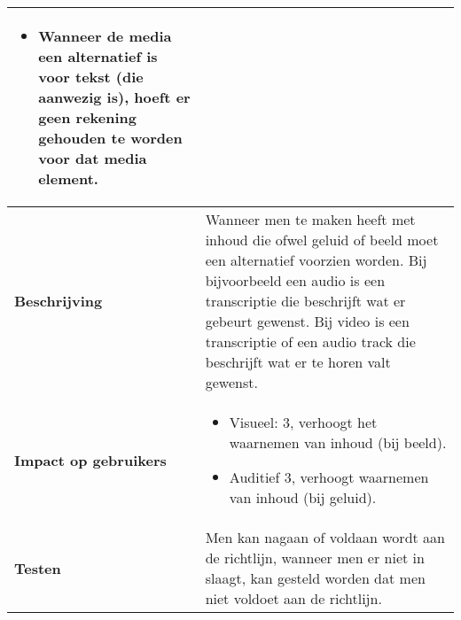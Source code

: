\begin{table}[H]
\begin{tabular}{|l|p{12cm}|}
\begin{itemize}
        \item Wanneer de media een alternatief is voor tekst (die aanwezig is), hoeft er geen rekening gehouden te worden voor dat media element.
    \end{itemize}                                                                                                                                                                                                      \\ 
        \hline
        \textbf{Beschrijving}                & Wanneer men te maken heeft met inhoud die ofwel geluid of beeld moet een alternatief voorzien worden. Bij bijvoorbeeld een audio is een transcriptie die beschrijft wat er gebeurt gewenst. Bij video is een transcriptie of een audio track die beschrijft wat er te horen valt gewenst. \\ 
        \hline
        \textbf{Impact op gebruikers}        & 
        \begin{itemize}
            \item Visueel: 3, verhoogt het waarnemen van inhoud (bij beeld).
            \item Auditief 3, verhoogt waarnemen van inhoud (bij geluid).             
        \end{itemize}                                                                                                                   \\ 
        \hline
        \textbf{Testen}                      & Men kan nagaan of voldaan wordt aan de richtlijn, wanneer men er niet in slaagt, kan gesteld worden dat men niet voldoet aan de richtlijn.                                                                                                                                                                                                            \\
        \hline
    \end{tabular}
\end{table}

